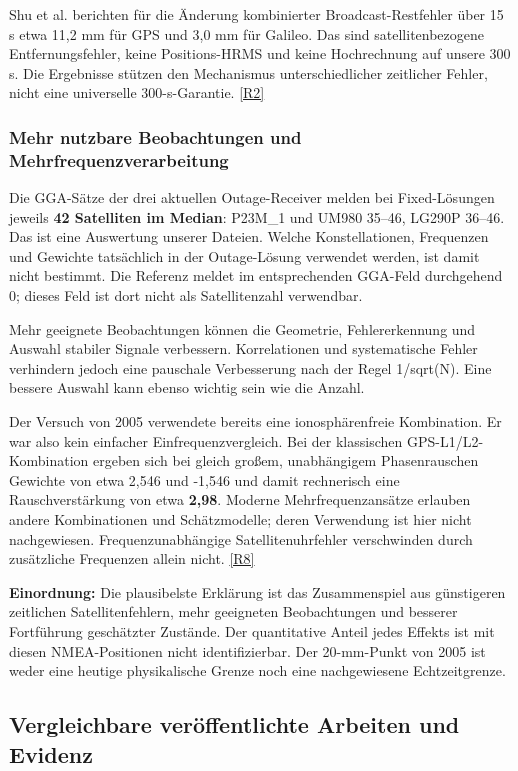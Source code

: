 \documentclass[11pt,a4paper]{article}
\numberwithin{equation}{section}
\numberwithin{figure}{section}
\begin{document}
Shu et al. berichten für die Änderung kombinierter Broadcast-Restfehler über 15 s etwa 11,2 mm für GPS und 3,0 mm für Galileo. Das sind satellitenbezogene Entfernungsfehler, keine Positions-HRMS und keine Hochrechnung auf unsere 300 s. Die Ergebnisse stützen den Mechanismus unterschiedlicher zeitlicher Fehler, nicht eine universelle 300-s-Garantie. \hyperlink{ref-R2}{[R2]}

\subsubsection{Mehr nutzbare Beobachtungen und Mehrfrequenzverarbeitung}

Die GGA-Sätze der drei aktuellen Outage-Receiver melden bei Fixed-Lösungen jeweils \textbf{42 Satelliten im Median}: P23M\_1 und UM980 35–46, LG290P 36–46. Das ist eine Auswertung unserer Dateien. Welche Konstellationen, Frequenzen und Gewichte tatsächlich in der Outage-Lösung verwendet werden, ist damit nicht bestimmt. Die Referenz meldet im entsprechenden GGA-Feld durchgehend 0; dieses Feld ist dort nicht als Satellitenzahl verwendbar.

Mehr geeignete Beobachtungen können die Geometrie, Fehlererkennung und Auswahl stabiler Signale verbessern. Korrelationen und systematische Fehler verhindern jedoch eine pauschale Verbesserung nach der Regel 1/\allowbreak{}sqrt(N). Eine bessere Auswahl kann ebenso wichtig sein wie die Anzahl.

Der Versuch von 2005 verwendete bereits eine ionosphärenfreie Kombination. Er war also kein einfacher Einfrequenzvergleich. Bei der klassischen GPS-L1/\allowbreak{}L2-Kombination ergeben sich bei gleich großem, unabhängigem Phasenrauschen Gewichte von etwa 2,546 und -1,546 und damit rechnerisch eine Rauschverstärkung von etwa \textbf{2,98}. Moderne Mehrfrequenzansätze erlauben andere Kombinationen und Schätzmodelle; deren Verwendung ist hier nicht nachgewiesen. Frequenzunabhängige Satellitenuhrfehler verschwinden durch zusätzliche Frequenzen allein nicht. \hyperlink{ref-R8}{[R8]}

\textbf{Einordnung:} Die plausibelste Erklärung ist das Zusammenspiel aus günstigeren zeitlichen Satellitenfehlern, mehr geeigneten Beobachtungen und besserer Fortführung geschätzter Zustände. Der quantitative Anteil jedes Effekts ist mit diesen NMEA-Positionen nicht identifizierbar. Der 20-mm-Punkt von 2005 ist weder eine heutige physikalische Grenze noch eine nachgewiesene Echtzeitgrenze.

\subsection{Vergleichbare veröffentlichte Arbeiten und Evidenz}
\end{document}
